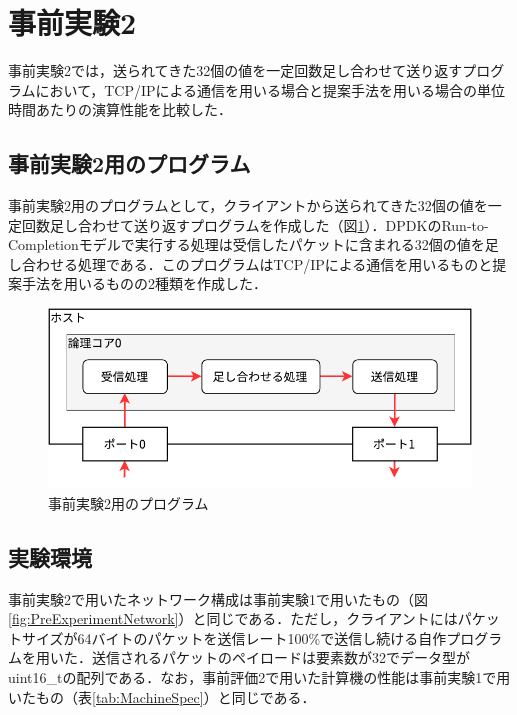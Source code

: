 \section{事前実験2}
\label{sec:PreExperimentTwo}
事前実験2では，送られてきた32個の値を一定回数足し合わせて送り返すプログラムにおいて，TCP/IPによる通信を用いる場合と提案手法を用いる場合の単位時間あたりの演算性能を比較した．

\subsection{事前実験2用のプログラム}
事前実験2用のプログラムとして，クライアントから送られてきた32個の値を一定回数足し合わせて送り返すプログラムを作成した（図\ref{fig:PreExperimentTwo}）．DPDKのRun-to-Completionモデルで実行する処理は受信したパケットに含まれる32個の値を足し合わせる処理である．このプログラムはTCP/IPによる通信を用いるものと提案手法を用いるものの2種類を作成した．

\begin{figure}[htb]
  \centering
  \includegraphics[width=\columnwidth]{pictures/PreExperimentTwo.pdf}
  \caption{事前実験2用のプログラム}
  \label{fig:PreExperimentTwo}
\end{figure}

\subsection{実験環境}
事前実験2で用いたネットワーク構成は事前実験1で用いたもの（図\ref{fig:PreExperimentNetwork}）と同じである．ただし，クライアントにはパケットサイズが64バイトのパケットを送信レート100\%で送信し続ける自作プログラムを用いた．送信されるパケットのペイロードは要素数が32でデータ型がuint16\_tの配列である．なお，事前評価2で用いた計算機の性能は事前実験1で用いたもの（表\ref{tab:MachineSpec}）と同じである．

